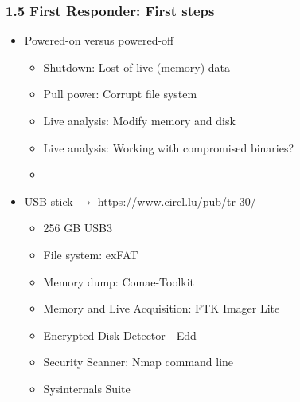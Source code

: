 \begin{frame}
  \frametitle{1.5 First Responder: First steps}
  \begin{itemize}
      \item Powered-on versus powered-off
      \begin{itemize}
	  \item Shutdown: Lost of live (memory) data
          \item Pull power: Corrupt file system
          \item Live analysis: Modify memory and disk
          \item Live analysis: Working with compromised binaries?
	  \item[]
      \end{itemize}
      \item USB stick $\to$ \url{https://www.circl.lu/pub/tr-30/}
      \begin{itemize}
          \item 256 GB USB3
          \item File system: exFAT
          \item Memory dump: Comae-Toolkit
          \item Memory and Live Acquisition: FTK Imager Lite
          \item Encrypted Disk Detector - Edd
          \item Security Scanner: Nmap command line
          \item Sysinternals Suite
      \end{itemize}
  \end{itemize}
\end{frame}


